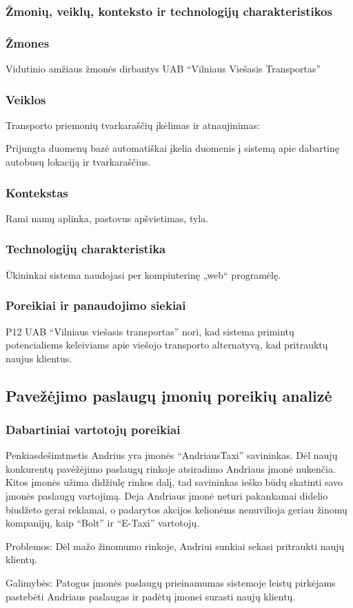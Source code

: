 \documentclass{article}
\begin{document}
\subsubsection{Žmonių, veiklų, konteksto ir technologijų charakteristikos}
\subsubsection*{Žmones}
	Vidutinio amžiaus žmonės dirbantys UAB “Vilniaus Viešasis Transportas”
\subsubsection*{Veiklos}
	Transporto priemonių tvarkaraščių įkėlimas ir atnaujinimas:\par
	Prijungta duomenų bazė automatiškai įkelia duomenis į sistemą apie dabartinę autobusų lokaciją ir tvarkaraščius. 
\subsubsection*{Kontekstas}
	Rami namų aplinka, pastovus apšvietimas, tyla.
\subsubsection*{Technologijų charakteristika}	
	Ūkininkai sistema naudojasi per kompiuterinę „web“ programėlę.
\subsubsection{Poreikiai ir panaudojimo siekiai}
	P12 UAB “Vilniaus viešasis transportas” nori, kad sistema primintų potencialiems keleiviams apie viešojo transporto alternatyvą, kad pritrauktų naujus klientus.
	\pagebreak

\subsection{Pavežėjimo paslaugų įmonių poreikių analizė}
\subsubsection{Dabartiniai vartotojų poreikiai}
	Penkiasdešimtmetis Andrius yra įmonės “AndriausTaxi” savininkas. Dėl naujų konkurentų pavėžėjimo paslaugų rinkoje atsiradimo Andriaus įmonė nukenčia. Kitos įmonės užima didžiulę rinkos dalį, tad savininkas ieško būdų skatinti savo įmonės paslaugų vartojimą. Deja Andriaus įmonė neturi pakankamai didelio biudžeto gerai reklamai, o padarytos akcijos kelionėms nenuvilioja geriau žinomų kompanijų, kaip “Bolt” ir “E-Taxi” vartotojų.\par
	Problemos: Dėl mažo žinomumo rinkoje, Andriui sunkiai sekasi pritraukti naujų klientų. \par
	Galimybės: Patogus įmonės paslaugų prieinamumas sistemoje leistų pirkėjams pastebėti Andriaus paslaugas ir padėtų įmonei surasti naujų klientų.
\end{document}
